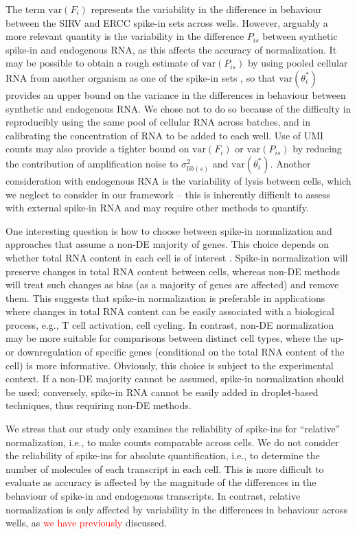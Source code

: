 \documentclass{article}
\newcommand{\revised}[1]{\textcolor{red}{#1}}
\newcommand\variance{\mbox{var}}
\begin{document}
The term $\variance(F_i)$ represents the variability in the difference in behaviour between the SIRV and ERCC spike-in sets across wells.
However, arguably a more relevant quantity is the variability in the difference $P_{is}$ between synthetic spike-in and endogenous RNA, as this affects the accuracy of normalization.
It may be possible to obtain a rough estimate of $\variance(P_{is})$ by using pooled cellular RNA from another organism as one of the spike-in sets \autocite{brennecke2013accounting}, so that $\variance(\theta^*_i)$ provides an upper bound on the variance in the differences in behaviour between synthetic and endogenous RNA.
We chose not to do so because of the difficulty in reproducibly using the same pool of cellular RNA across batches, and in calibrating the concentration of RNA to be added to each well.
Use of UMI counts may also provide a tighter bound on $\variance(F_i)$ or $\variance(P_{is})$ by reducing the contribution of amplification noise to $\sigma^2_{lib(s)}$ and $\variance(\theta^*_i)$.
Another consideration with endogenous RNA is the variability of lysis between cells, which we neglect to consider in our framework -- this is inherently difficult to assess with external spike-in RNA and may require other methods to quantify.

One interesting question is how to choose between spike-in normalization and approaches that assume a non-DE majority of genes.
This choice depends on whether total RNA content in each cell is of interest \autocite{lun2016stepbystep}.
Spike-in normalization will preserve changes in total RNA content between cells, whereas non-DE methods will treat such changes as bias (as a majority of genes are affected) and remove them.
This suggests that spike-in normalization is preferable in applications where changes in total RNA content can be easily associated with a biological process, e.g., T cell activation,   cell cycling.
In contrast, non-DE normalization may be more suitable for comparisons between distinct cell types, where the up- or downregulation of specific genes (conditional on the total RNA content of the cell) is more informative.
Obviously, this choice is subject to the experimental context.
If a non-DE majority cannot be assumed, spike-in normalization should be used; conversely, spike-in RNA cannot be easily added in droplet-based techniques, thus requiring non-DE methods.

We stress that our study only examines the reliability of spike-ins for ``relative'' normalization, i.e., to make counts comparable across cells.
We do not consider the reliability of spike-ins for absolute quantification, i.e., to determine the number of molecules of each transcript in each cell.
This is more difficult to evaluate as accuracy is affected by the magnitude of the differences in the behaviour of spike-in and endogenous transcripts.
In contrast, relative normalization is only affected by variability in the differences in behaviour across wells, as \revised{we have previously} discussed.
\end{document}
